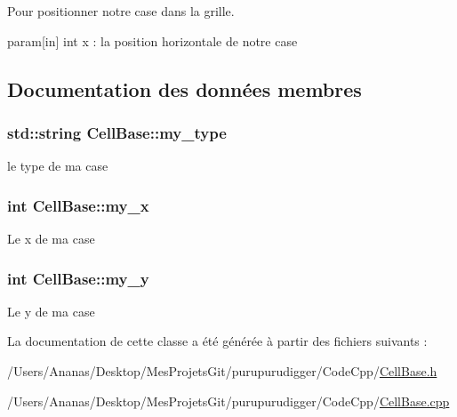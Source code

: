 Pour positionner notre case dans la grille. 

param\mbox{[}in\mbox{]} int x \-: la position horizontale de notre case 

\subsection{Documentation des données membres}
\hypertarget{class_cell_base_a4039c6141e348f927d90297d01e19509}{
\subsubsection[{my\-\_\-type}]{\setlength{\rightskip}{0pt plus 5cm}std\-::string Cell\-Base\-::my\-\_\-type\hspace{0.3cm}{\ttfamily [protected]}}}\label{class_cell_base_a4039c6141e348f927d90297d01e19509}
le type de ma case \hypertarget{class_cell_base_a9dc2714aa92817ba6a6a23da19eb4fde}{
\subsubsection[{my\-\_\-x}]{\setlength{\rightskip}{0pt plus 5cm}int Cell\-Base\-::my\-\_\-x\hspace{0.3cm}{\ttfamily [protected]}}}\label{class_cell_base_a9dc2714aa92817ba6a6a23da19eb4fde}
Le x de ma case \hypertarget{class_cell_base_a39722b0f229e34f50c7b9d4d12d19a52}{
\subsubsection[{my\-\_\-y}]{\setlength{\rightskip}{0pt plus 5cm}int Cell\-Base\-::my\-\_\-y\hspace{0.3cm}{\ttfamily [protected]}}}\label{class_cell_base_a39722b0f229e34f50c7b9d4d12d19a52}
Le y de ma case 

La documentation de cette classe a été générée à partir des fichiers suivants \-:\begin{DoxyCompactItemize}
\item 
/\-Users/\-Ananas/\-Desktop/\-Mes\-Projets\-Git/purupurudigger/\-Code\-Cpp/\hyperlink{_cell_base_8h}{Cell\-Base.\-h}\item 
/\-Users/\-Ananas/\-Desktop/\-Mes\-Projets\-Git/purupurudigger/\-Code\-Cpp/\hyperlink{_cell_base_8cpp}{Cell\-Base.\-cpp}\end{DoxyCompactItemize}
